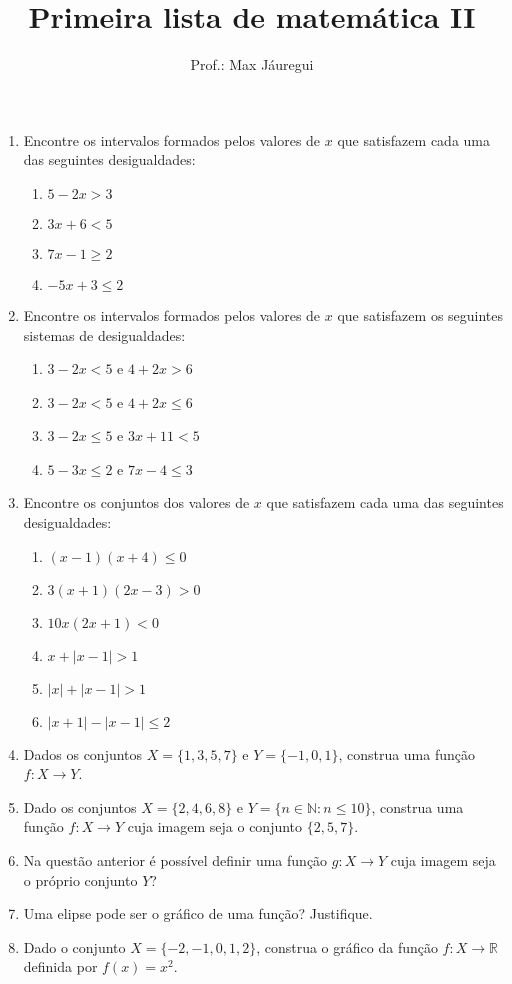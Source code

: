 \documentclass[12pt,a4paper]{article}
\title{Primeira lista de matemática II}
\author{Prof.: Max Jáuregui}
\date{}
\newcommand{\N}{\mathbb{N}}
\newcommand{\R}{\mathbb{R}}
\begin{document}
\maketitle

\begin{enumerate}
  \item Encontre os intervalos formados pelos valores de $x$ que satisfazem cada uma das seguintes desigualdades:
  \begin{enumerate}
    \item $5-2x>3$
    \item $3x+6<5$
    \item $7x-1\ge 2$
    \item $-5x+3\le 2$
  \end{enumerate}
  \item Encontre os intervalos formados pelos valores de $x$ que satisfazem os seguintes sistemas de desigualdades:
  \begin{enumerate}
    \item $3-2x<5$ e $4+2x>6$
    \item $3-2x<5$ e $4+2x\le 6$
    \item $3-2x\le 5$ e $3x+11<5$
    \item $5-3x\le 2$ e $7x-4\le 3$
  \end{enumerate}
  \item Encontre os conjuntos dos valores de $x$ que satisfazem cada uma das seguintes desigualdades:
  \begin{enumerate}
    \item $(x-1)(x+4)\le 0$
    \item $3(x+1)(2x-3)>0$
    \item $10x(2x+1)<0$
    \item $x+|x-1|>1$
    \item $|x|+|x-1|>1$
    \item $|x+1|-|x-1|\le 2$
  \end{enumerate}
  \item Dados os conjuntos $X=\{1,3,5,7\}$ e $Y=\{-1,0,1\}$, construa uma função $f:X\to Y$.
  \item Dado os conjuntos $X=\{2,4,6,8\}$ e $Y=\{n\in\N:n\le 10\}$, construa uma função $f:X\to Y$ cuja imagem seja o conjunto $\{2,5,7\}$.
  \item Na questão anterior é possível definir uma função $g:X\to Y$ cuja imagem seja o próprio conjunto $Y$?
  \item Uma elipse pode ser o gráfico de uma função? Justifique.
  \item Dado o conjunto $X=\{-2,-1,0,1,2\}$, construa o gráfico da função $f:X\to\R$ definida por $f(x)=x^2$.
\end{enumerate}
\end{document}
